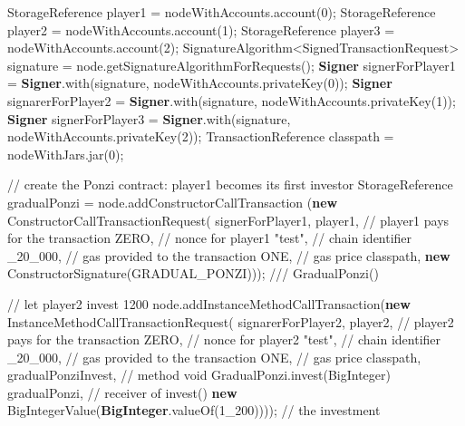 \documentclass[a4paper,]{book}
\newenvironment{Shaded}{\begin{snugshade}}{\end{snugshade}}
\newcommand{\BuiltInTok}[1]{\textcolor[rgb]{0.39,0.29,0.61}{\textbf{#1}}}
\newcommand{\CommentTok}[1]{\textcolor[rgb]{0.54,0.53,0.53}{#1}}
\newcommand{\DecValTok}[1]{\textcolor[rgb]{0.69,0.50,0.00}{#1}}
\newcommand{\FunctionTok}[1]{\textcolor[rgb]{0.39,0.29,0.61}{#1}}
\newcommand{\KeywordTok}[1]{\textcolor[rgb]{0.12,0.11,0.11}{\textbf{#1}}}
\newcommand{\NormalTok}[1]{\textcolor[rgb]{0.12,0.11,0.11}{#1}}
\newcommand{\StringTok}[1]{\textcolor[rgb]{0.75,0.01,0.01}{#1}}
\renewenvironment{Shaded}{\begin{snugshade}\small}{\end{snugshade}}
\begin{document}
{\begin{Shaded}
\begin{Highlighting}[]
\NormalTok{      StorageReference player1 = nodeWithAccounts.}\FunctionTok{account}\NormalTok{(}\DecValTok{0}\NormalTok{);}
\NormalTok{      StorageReference player2 = nodeWithAccounts.}\FunctionTok{account}\NormalTok{(}\DecValTok{1}\NormalTok{);}
\NormalTok{      StorageReference player3 = nodeWithAccounts.}\FunctionTok{account}\NormalTok{(}\DecValTok{2}\NormalTok{);}
\NormalTok{      SignatureAlgorithm<SignedTransactionRequest> signature}
\NormalTok{        = node.}\FunctionTok{getSignatureAlgorithmForRequests}\NormalTok{();}
      \BuiltInTok{Signer}\NormalTok{ signerForPlayer1 = }\BuiltInTok{Signer}\NormalTok{.}\FunctionTok{with}\NormalTok{(signature, nodeWithAccounts.}\FunctionTok{privateKey}\NormalTok{(}\DecValTok{0}\NormalTok{));}
      \BuiltInTok{Signer}\NormalTok{ signarerForPlayer2 = }\BuiltInTok{Signer}\NormalTok{.}\FunctionTok{with}\NormalTok{(signature, nodeWithAccounts.}\FunctionTok{privateKey}\NormalTok{(}\DecValTok{1}\NormalTok{));}
      \BuiltInTok{Signer}\NormalTok{ signerForPlayer3 = }\BuiltInTok{Signer}\NormalTok{.}\FunctionTok{with}\NormalTok{(signature, nodeWithAccounts.}\FunctionTok{privateKey}\NormalTok{(}\DecValTok{2}\NormalTok{));}
\NormalTok{      TransactionReference classpath = nodeWithJars.}\FunctionTok{jar}\NormalTok{(}\DecValTok{0}\NormalTok{);}

      \CommentTok{// create the Ponzi contract: player1 becomes its first investor}
\NormalTok{      StorageReference gradualPonzi = node.}\FunctionTok{addConstructorCallTransaction}
\NormalTok{        (}\KeywordTok{new} \FunctionTok{ConstructorCallTransactionRequest}\NormalTok{(}
\NormalTok{          signerForPlayer1,}
\NormalTok{          player1, }\CommentTok{// player1 pays for the transaction}
\NormalTok{          ZERO, }\CommentTok{// nonce for player1}
          \StringTok{"test"}\NormalTok{, }\CommentTok{// chain identifier}
\NormalTok{          _}\DecValTok{20_000}\NormalTok{, }\CommentTok{// gas provided to the transaction}
\NormalTok{          ONE, }\CommentTok{// gas price}
\NormalTok{          classpath,}
          \KeywordTok{new} \FunctionTok{ConstructorSignature}\NormalTok{(GRADUAL_PONZI))); }\CommentTok{/// GradualPonzi()}

      \CommentTok{// let player2 invest 1200}
\NormalTok{      node.}\FunctionTok{addInstanceMethodCallTransaction}\NormalTok{(}\KeywordTok{new} \FunctionTok{InstanceMethodCallTransactionRequest}\NormalTok{(}
\NormalTok{        signarerForPlayer2,}
\NormalTok{        player2, }\CommentTok{// player2 pays for the transaction}
\NormalTok{        ZERO, }\CommentTok{// nonce for player2}
        \StringTok{"test"}\NormalTok{, }\CommentTok{// chain identifier}
\NormalTok{        _}\DecValTok{20_000}\NormalTok{, }\CommentTok{// gas provided to the transaction}
\NormalTok{        ONE, }\CommentTok{// gas price}
\NormalTok{        classpath,}
\NormalTok{        gradualPonziInvest, }\CommentTok{// method void GradualPonzi.invest(BigInteger)}
\NormalTok{        gradualPonzi, }\CommentTok{// receiver of invest()}
        \KeywordTok{new} \FunctionTok{BigIntegerValue}\NormalTok{(}\BuiltInTok{BigInteger}\NormalTok{.}\FunctionTok{valueOf}\NormalTok{(}\DecValTok{1_200}\NormalTok{)))); }\CommentTok{// the investment}


\end{Highlighting}
\end{Shaded}}
\end{document}

